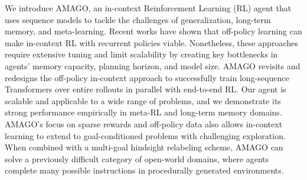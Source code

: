 We introduce AMAGO, an in-context Reinforcement Learning (RL) agent that uses sequence models to tackle the challenges of generalization, long-term memory, and meta-learning. Recent works have shown that off-policy learning can make in-context RL with recurrent policies viable. Nonetheless, these approaches require extensive tuning and limit scalability by creating key bottlenecks in agents' memory capacity, planning horizon, and model size. AMAGO revisits and redesigns the off-policy in-context approach to successfully train long-sequence Transformers over entire rollouts in parallel with end-to-end RL. Our agent is scalable and applicable to a wide range of problems, and we demonstrate its strong performance empirically in meta-RL and long-term memory domains. AMAGO's focus on sparse rewards and off-policy data also allows in-context learning to extend to goal-conditioned problems with challenging exploration. When combined with a multi-goal hindsight relabeling scheme, AMAGO can solve a previously difficult category of open-world domains, where agents complete many possible instructions in procedurally generated environments. 
